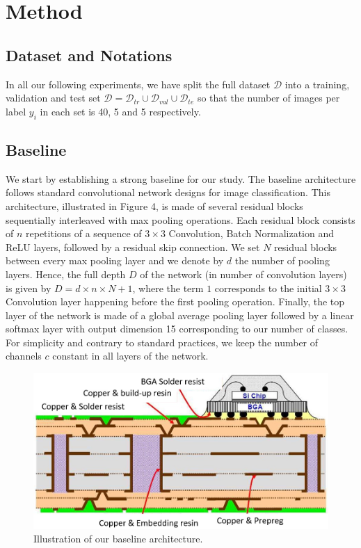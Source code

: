 \documentclass[10pt,twocolumn,letterpaper]{article}
\begin{document}
\section{Method}

\subsection{Dataset and Notations}

In all our following experiments, we have split the full dataset $\mathcal{D}$ into a training, validation and test set $\mathcal{D}=\mathcal{D}_{tr} \cup \mathcal{D}_{val} \cup \mathcal{D}_{te}$ so that the number of images per label $y_i$ in each set is 40, 5 and 5 respectively.

\subsection{Baseline}

We start by establishing a strong baseline for our study.
The baseline architecture follows standard convolutional network designs for image classification.
This architecture, illustrated in Figure 4, is made of several residual blocks 
sequentially interleaved with max pooling operations.
Each residual block consists of $n$ repetitions of a sequence of 
$3 \times 3$ Convolution, Batch Normalization and ReLU layers,
followed by a residual skip connection.
We set $N$ residual blocks between every max pooling layer
and we denote by $d$ the number of pooling layers.
Hence, the full depth $D$ of the network (in number of convolution layers) 
is given by $D=d \times n \times N +1$, where the term $1$ corresponds to the
initial $3 \times 3$ Convolution layer happening before the first pooling operation.
Finally, the top layer of the network is made of a global average pooling layer 
followed by a linear softmax layer with output dimension 15 corresponding to our number of classes.
For simplicity and contrary to standard practices, we keep the number of channels $c$ constant 
in all layers of the network.

\begin{figure}[h]
	\centering
	\includegraphics[width=0.9\linewidth]{"./figures/Figure1"}
	\caption{
		Illustration of our baseline architecture.
	}
\end{figure}
\end{document}
